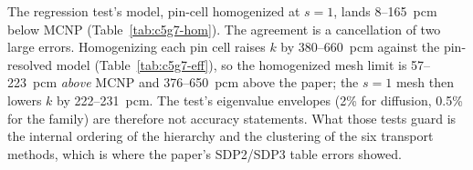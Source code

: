 The regression test's model, pin-cell homogenized at $s = 1$, lands 8--165~pcm
below MCNP (Table~\ref{tab:c5g7-hom}). The agreement is a cancellation of two
large errors. Homogenizing each pin cell raises $k$ by 380--660~pcm against
the pin-resolved model (Table~\ref{tab:c5g7-eff}), so the homogenized mesh
limit is 57--223~pcm \emph{above} MCNP and 376--650~pcm above the paper; the
$s = 1$ mesh then lowers $k$ by 222--231~pcm. The test's eigenvalue envelopes
(2\% for diffusion, 0.5\% for the family) are therefore not accuracy
statements. What those tests guard is the internal ordering of the hierarchy
and the clustering of the six transport methods, which is where the paper's
SDP2/SDP3 table errors showed.
